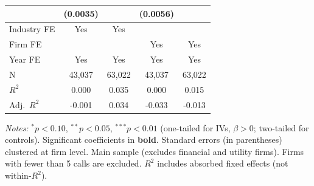 \documentclass[11pt,a4paper]{article}
\begin{document}
\begin{table}[htbp]
\begin{tabular}{lcccc}
 & (0.0035) &  & (0.0056) &  \\
\midrule
Industry FE & Yes & Yes &  &  \\
Firm FE &  &  & Yes & Yes \\
Year FE & Yes & Yes & Yes & Yes \\
\midrule
N & 43,037 & 63,022 & 43,037 & 63,022 \\
$R^2$ & 0.000 & 0.035 & 0.000 & 0.015 \\
Adj.~$R^2$ & -0.001 & 0.034 & -0.033 & -0.013 \\
\bottomrule
\end{tabular}
\begin{minipage}{\linewidth}
\vspace{2pt}\scriptsize
\textit{Notes:} $^{*}p<0.10$, $^{**}p<0.05$, $^{***}p<0.01$ (one-tailed for IVs, $\beta > 0$; two-tailed for controls).
 Significant coefficients in \textbf{bold}.
 Standard errors (in parentheses) clustered at firm level.
 Main sample (excludes financial and utility firms). Firms with fewer than 5 calls are excluded.
 $R^2$ includes absorbed fixed effects (not within-$R^2$).
\end{minipage}
\end{table}
\clearpage
\end{document}

